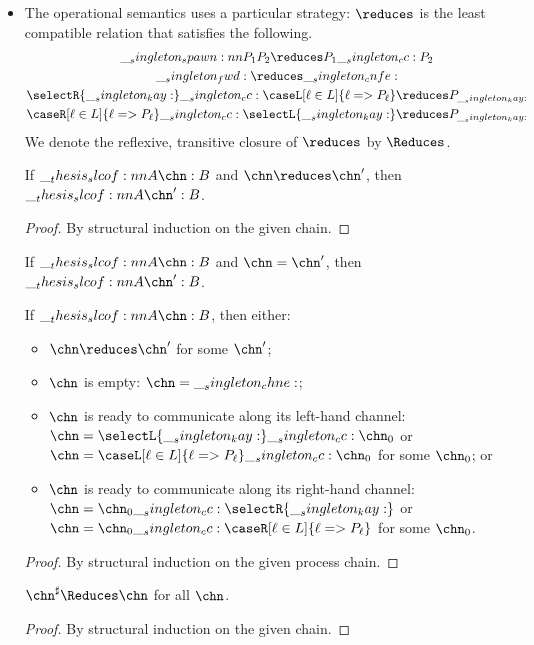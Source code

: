 \begin{itemize}
\item The operational semantics uses a particular strategy: $\reduces$ is the least compatible relation that satisfies the following.
  \begin{gather*}
    \spawn{P_1}{P_2} \reduces P_1 \cc P_2 \\
    \fwd \reduces \cnfe \\
    \selectR{\kay} \cc \caseL[\ell \in L]{\ell => P_{\ell}} \reduces P_{\kay} \\
    \caseR[\ell \in L]{\ell => P_{\ell}} \cc \selectL{\kay} \reduces P_{\kay}
  \end{gather*}
  We denote the reflexive, transitive closure of $\reduces$ by $\Reduces$.

  \begin{theorem}
    If $\slcof{A |- \chn : B}$ and $\chn \reduces \chn'$, then $\slcof{A |- \chn' : B}$.
  \end{theorem}
  \begin{proof}
    By structural induction on the given chain.
  \end{proof}


  \begin{lemma}
    If $\slcof{A |- \chn : B}$ and $\chn = \chn'$, then $\slcof{A |- \chn' : B}$.
  \end{lemma}

  \begin{theorem}[Progress]
    If $\slcof{A |- \chn : B}$, then either:
    \begin{itemize}
    \item $\chn \reduces \chn'$ for some $\chn'$;
    \item $\chn$ is empty: $\chn = \chne$;
    \item $\chn$ is ready to communicate along its left-hand channel: $\chn = \selectL{\kay} \cc \chn_0$ or $\chn = \caseL[\ell \in L]{\ell => P_{\ell}} \cc \chn_0$ for some $\chn_0$; or
    \item $\chn$ is ready to communicate along its right-hand channel: $\chn = \chn_0 \cc \selectR{\kay}$ or $\chn = \chn_0 \cc \caseR[\ell \in L]{\ell => P_{\ell}}$ for some $\chn_0$.
    \end{itemize}
  \end{theorem}
  \begin{proof}
    By structural induction on the given process chain.
  \end{proof}

  \begin{theorem}
    $\chn^\sharp \Reduces \chn$ for all $\chn$.
  \end{theorem}
  \begin{proof}
    By structural induction on the given chain.
  \end{proof}


\end{itemize}
